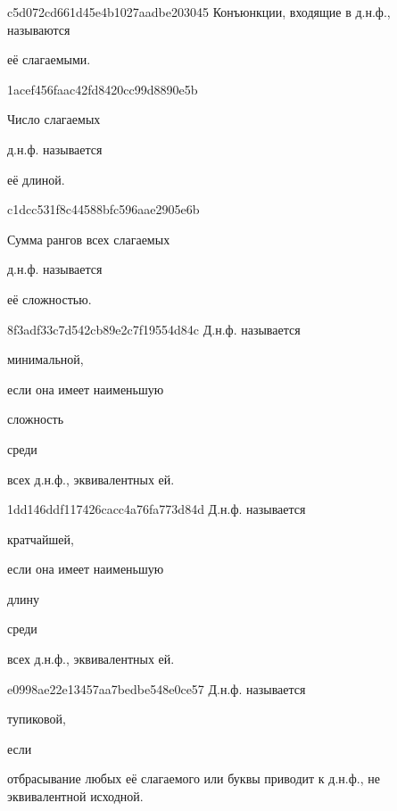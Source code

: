 \begin{note}{c5d072cd661d45e4b1027aadbe203045}
    Конъюнкции, входящие в д.н.ф., называются \begin{icloze}{1}её слагаемыми.\end{icloze}
\end{note}

\begin{note}{1acef456faac42fd8420cc99d8890e5b}
    \begin{icloze}{2}Число слагаемых\end{icloze} д.н.ф. называется \begin{icloze}{1}её длиной.\end{icloze}
\end{note}

\begin{note}{c1dcc531f8c44588bfc596aae2905e6b}
    \begin{icloze}{2}Сумма рангов всех слагаемых\end{icloze} д.н.ф. называется \begin{icloze}{1}её сложностью.\end{icloze}
\end{note}

\begin{note}{8f3adf33c7d542cb89e2c7f19554d84c}
    Д.н.ф. называется \begin{icloze}{3}минимальной,\end{icloze} если она имеет наименьшую \begin{icloze}{1}сложность\end{icloze} среди \begin{icloze}{2}всех д.н.ф., эквивалентных ей.\end{icloze}
\end{note}

\begin{note}{1dd146ddf117426cacc4a76fa773d84d}
    Д.н.ф. называется \begin{icloze}{3}кратчайшей,\end{icloze} если она имеет наименьшую \begin{icloze}{1}длину\end{icloze} среди \begin{icloze}{2}всех д.н.ф., эквивалентных ей.\end{icloze}
\end{note}

\begin{note}{e0998ae22e13457aa7bedbe548e0ce57}
    Д.н.ф. называется \begin{icloze}{2}тупиковой,\end{icloze} если \begin{icloze}{1}отбрасывание любых её слагаемого или буквы приводит к д.н.ф., не эквивалентной исходной.\end{icloze}
\end{note}


